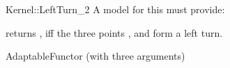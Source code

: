 \begin{ccRefFunctionObjectConcept}{Kernel::LeftTurn_2}
A model for this must provide:


{returns , iff the three points ,  
and  form a left turn.}

\ccRefines
AdaptableFunctor (with three arguments)

\ccSeeAlso
{}\\

\end{ccRefFunctionObjectConcept}
